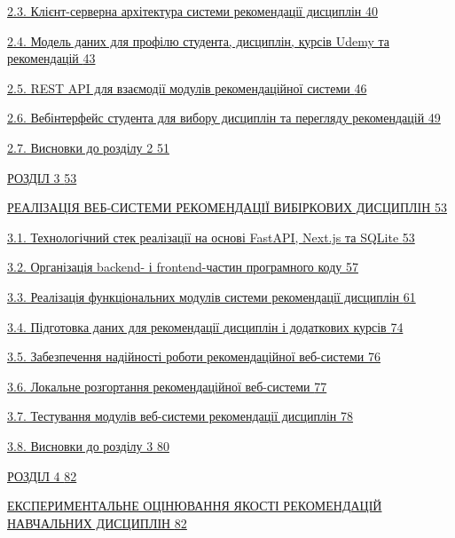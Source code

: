 \documentclass[
]{article}
\begin{document}
\hyperref[_Toc230434089]{2.3. Клієнт-серверна архітектура системи
рекомендації дисциплін \hyperref[_Toc230434089]{40}}

\hyperref[_Toc230434090]{2.4. Модель даних для профілю студента,
дисциплін, курсів Udemy та рекомендацій \hyperref[_Toc230434090]{43}}

\hyperref[_Toc230434091]{2.5. REST API для взаємодії модулів
рекомендаційної системи \hyperref[_Toc230434091]{46}}

\hyperref[_Toc230434092]{2.6. Вебінтерфейс студента для вибору дисциплін
та перегляду рекомендацій \hyperref[_Toc230434092]{49}}

\hyperref[_Toc230434093]{2.7. Висновки до розділу 2
\hyperref[_Toc230434093]{51}}

\hyperref[_Toc230434094]{РОЗДІЛ 3 \hyperref[_Toc230434094]{53}}

\hyperref[_Toc230434095]{РЕАЛІЗАЦІЯ ВЕБ-СИСТЕМИ РЕКОМЕНДАЦІЇ ВИБІРКОВИХ
ДИСЦИПЛІН \hyperref[_Toc230434095]{53}}

\hyperref[_Toc230434096]{3.1. Технологічний стек реалізації на основі
FastAPI, Next.js та SQLite \hyperref[_Toc230434096]{53}}

\hyperref[_Toc230434097]{3.2. Організація backend- і frontend-частин
програмного коду \hyperref[_Toc230434097]{57}}

\hyperref[_Toc230434098]{3.3. Реалізація функціональних модулів системи
рекомендації дисциплін \hyperref[_Toc230434098]{61}}

\hyperref[_Toc230434099]{3.4. Підготовка даних для рекомендації
дисциплін і додаткових курсів \hyperref[_Toc230434099]{74}}

\hyperref[_Toc230434100]{3.5. Забезпечення надійності роботи
рекомендаційної веб-системи \hyperref[_Toc230434100]{76}}

\hyperref[_Toc230434101]{3.6. Локальне розгортання рекомендаційної
веб-системи \hyperref[_Toc230434101]{77}}

\hyperref[_Toc230434102]{3.7. Тестування модулів веб-системи
рекомендації дисциплін \hyperref[_Toc230434102]{78}}

\hyperref[_Toc230434103]{3.8. Висновки до розділу 3
\hyperref[_Toc230434103]{80}}

\hyperref[X18419dff7653a7b63522449b206c8f6305e1af3]{РОЗДІЛ 4
\hyperref[X18419dff7653a7b63522449b206c8f6305e1af3]{82}}

\hyperref[_Toc230434105]{ЕКСПЕРИМЕНТАЛЬНЕ ОЦІНЮВАННЯ ЯКОСТІ РЕКОМЕНДАЦІЙ
НАВЧАЛЬНИХ ДИСЦИПЛІН \hyperref[_Toc230434105]{82}}
\end{document}
